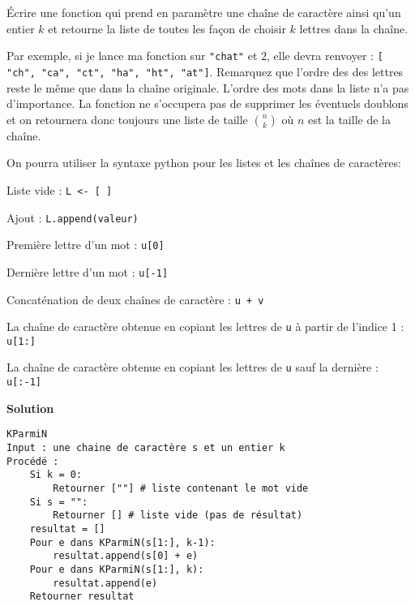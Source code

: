 \begin{exercice}
\'Ecrire une fonction qui prend en paramètre une chaîne de caractère ainsi qu'un entier $k$ et retourne la liste de toutes les
façon de choisir $k$ lettres dans la chaîne.

Par exemple, si je lance ma fonction sur \texttt{"chat"} et $2$, elle devra renvoyer : \texttt{[ "ch", "ca", "ct", "ha", "ht", "at"]}. Remarquez que l'ordre des des lettres reste le même que dans la chaîne originale. L'ordre des mots dans la liste n'a pas d'importance. La fonction ne s'occupera pas de supprimer les éventuels doublons et on retournera donc toujours une liste de taille $\binom{n}{k}$ où $n$ est la taille de la chaîne.

On pourra utiliser la syntaxe python pour les listes et les chaînes de caractères:

Liste vide : {\tt L <- [ ]}

Ajout : {\tt L.append(valeur)}

Première lettre d'un mot : {\tt u[0]}

Dernière lettre d'un mot : {\tt u[-1]}

Concaténation de deux chaînes de caractère : {\tt u + v}

La chaîne de caractère obtenue en copiant les lettres de {\tt u} à partir de l'indice 1 : {\tt u[1:]}

La chaîne de caractère obtenue en copiant les lettres de {\tt u} sauf la dernière : {\tt u[:-1]}

\textbf{Solution}

\begin{lstlisting}
KParmiN
Input : une chaine de caractère s et un entier k
Procédé :
    Si k = 0:
        Retourner [""] # liste contenant le mot vide
    Si s = "":
        Retourner [] # liste vide (pas de résultat)
    resultat = []
    Pour e dans KParmiN(s[1:], k-1):
        resultat.append(s[0] + e)
    Pour e dans KParmiN(s[1:], k):
        resultat.append(e)
    Retourner resultat

\end{lstlisting}
\end{exercice}